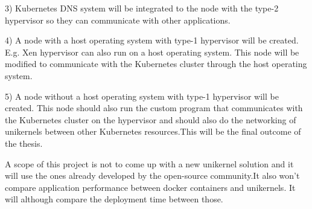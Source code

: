3) Kubernetes DNS system will be integrated to the node with the type-2 hypervisor so they can communicate with other applications.

4) A node with a host operating system with type-1 hypervisor will be created. E.g. Xen hypervisor can also run on a host operating system. This node will be modified to communicate with the Kubernetes cluster through the host operating system. 

5) A node without a host operating system with type-1 hypervisor will be created. This node should also run the custom program that communicates with the Kubernetes cluster on the hypervisor and should also do the networking of unikernels between other Kubernetes resources.This will be the final outcome of the thesis.


A scope of this project is not to come up with a new unikernel solution and it will use the ones already developed by the open-source community.It also won't compare application performance between docker containers and unikernels. It will although compare the deployment time between those.
\fi